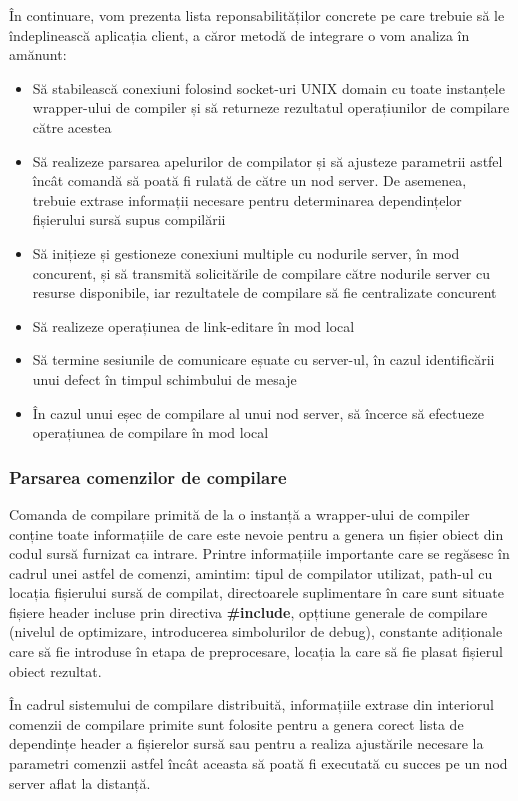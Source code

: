 În continuare, vom prezenta lista reponsabilităților concrete pe care trebuie să le îndeplinească aplicația client, a căror metodă de integrare o vom analiza 
în amănunt:

\begin{itemize}
    \item Să stabilească conexiuni folosind socket-uri UNIX domain cu toate instanțele wrapper-ului de compiler
    și să returneze rezultatul operațiunilor de compilare către acestea
    \item Să realizeze parsarea apelurilor de compilator și să ajusteze parametrii astfel încât comandă să poată fi rulată 
    de către un nod server. De asemenea, trebuie extrase informații necesare pentru determinarea dependințelor fișierului sursă
    supus compilării
    \item Să inițieze și gestioneze conexiuni multiple cu nodurile server, în mod concurent, și să transmită solicitările de compilare către
    nodurile server cu resurse disponibile, iar rezultatele de compilare să fie centralizate concurent
    \item Să realizeze operațiunea de link-editare în mod local
    \item Să termine sesiunile de comunicare eșuate cu server-ul, în cazul identificării unui defect în timpul schimbului de mesaje
    \item În cazul unui eșec de compilare al unui nod server, să încerce să efectueze operațiunea de compilare în mod local
\end{itemize}

\subsubsection{Parsarea comenzilor de compilare}

Comanda de compilare primită de la o instanță a wrapper-ului de compiler conține toate informațiile de care este nevoie pentru a genera un fișier obiect din codul sursă
furnizat ca intrare. Printre informațiile importante care se regăsesc în cadrul unei astfel de comenzi, amintim: tipul de compilator utilizat,
path-ul cu locația fișierului sursă de compilat, directoarele suplimentare în care sunt situate fișiere header incluse prin directiva \textbf{\#include},
opțtiune generale de compilare (nivelul de optimizare, introducerea simbolurilor de debug), constante adiționale care să fie introduse în etapa de preprocesare,
locația la care să fie plasat fișierul obiect rezultat. 

În cadrul sistemului de compilare distribuită, informațiile extrase din interiorul comenzii de compilare primite sunt folosite pentru a genera corect lista de dependințe 
header a fișierelor sursă sau pentru a realiza ajustările necesare la parametri comenzii astfel încât aceasta să poată fi executată cu succes pe un nod server aflat la distanță.

